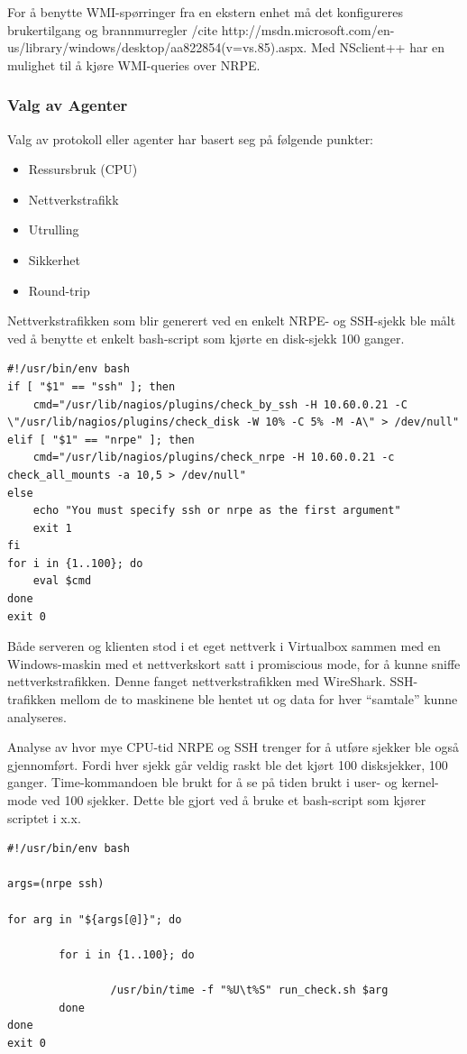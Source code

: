 For å benytte WMI-spørringer fra en ekstern enhet må det konfigureres brukertilgang og brannmurregler /cite http://msdn.microsoft.com/en-us/library/windows/desktop/aa822854(v=vs.85).aspx. Med NSclient++ har en mulighet til å kjøre WMI-queries over NRPE.

\subsubsection{Valg av Agenter}
Valg av protokoll eller agenter har basert seg på følgende punkter:
\begin{itemize}
	\item Ressursbruk (CPU)
	\item Nettverkstrafikk
	\item Utrulling
	\item Sikkerhet
	\item Round-trip
\end{itemize}
Nettverkstrafikken som blir generert ved en enkelt NRPE- og SSH-sjekk ble målt ved å benytte et enkelt bash-script som kjørte en disk-sjekk 100 ganger. 

\begin{lstlisting}
#!/usr/bin/env bash
if [ "$1" == "ssh" ]; then
    cmd="/usr/lib/nagios/plugins/check_by_ssh -H 10.60.0.21 -C \"/usr/lib/nagios/plugins/check_disk -W 10% -C 5% -M -A\" > /dev/null"
elif [ "$1" == "nrpe" ]; then
    cmd="/usr/lib/nagios/plugins/check_nrpe -H 10.60.0.21 -c check_all_mounts -a 10,5 > /dev/null"
else
    echo "You must specify ssh or nrpe as the first argument"
    exit 1
fi
for i in {1..100}; do
    eval $cmd
done
exit 0
\end{lstlisting}

Både serveren og klienten stod i et eget nettverk i Virtualbox sammen med en Windows-maskin med et nettverkskort satt i promiscious mode, for å kunne sniffe nettverkstrafikken. Denne fanget nettverkstrafikken med WireShark. SSH-trafikken mellom de to maskinene ble hentet ut og data for hver “samtale” kunne analyseres.  

Analyse av hvor mye CPU-tid NRPE og SSH trenger for å utføre sjekker ble også gjennomført. Fordi hver sjekk går veldig raskt ble det kjørt 100 disksjekker, 100 ganger. Time-kommandoen ble brukt for å se på tiden brukt i user- og kernel-mode ved 100 sjekker. Dette ble gjort ved å bruke et bash-script som kjører scriptet i x.x.

\begin{lstlisting}
#!/usr/bin/env bash

args=(nrpe ssh)

for arg in "${args[@]}"; do

        for i in {1..100}; do

                /usr/bin/time -f "%U\t%S" run_check.sh $arg
        done
done
exit 0
\end{lstlisting}

